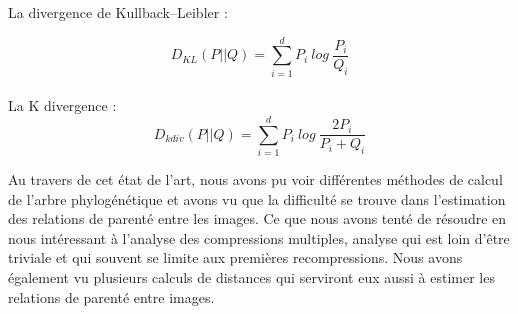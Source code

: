 \documentclass[utf8,final]{stageM2R} %
\begin{document}
La divergence de Kullback–Leibler :%

\begin{equation}
  D_{KL}(P||Q) = \sum\limits_{i=1}^{d} P_{i}\ log\ \frac{P_{i}}{Q_{i}}
\end{equation}
\\
La K divergence : 
\begin{equation}
  D_{kdiv}(P||Q) = \sum\limits_{i=1}^{d} P_{i}\ log\ \frac{2P_{i}}{P_{i}+Q_{i}}
\end{equation}

\vspace{8mm}
Au travers de cet état de l'art, nous avons pu voir différentes méthodes de calcul de l'arbre phylogénétique et avons vu que la difficulté se trouve dans l'estimation des relations de parenté entre les images. Ce que nous avons tenté de résoudre en nous intéressant à l'analyse des compressions multiples, analyse qui est loin d'être triviale et qui souvent se limite aux premières recompressions. Nous avons également vu plusieurs calculs de distances qui serviront eux aussi à estimer les relations de parenté entre images.

\end{document}
